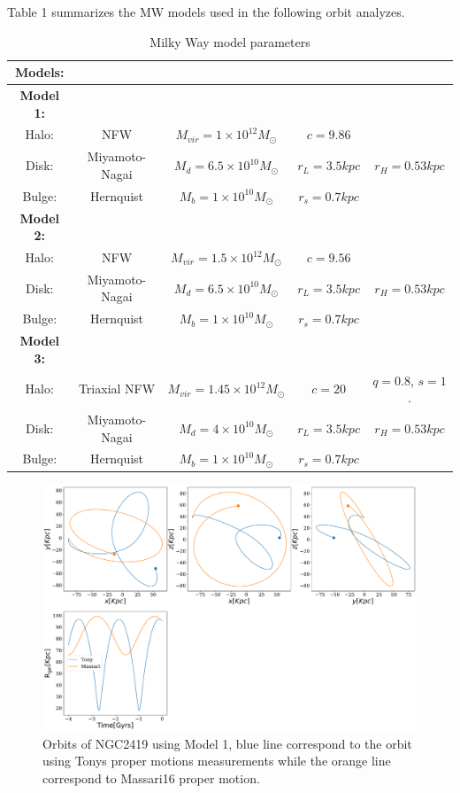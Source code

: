 \documentclass[14pt]{article}
\begin{document}
Table 1 summarizes the MW models used in the following orbit analyzes.

\begin{table}[H]
\centering
\begin{tabular}{c c c c c}
\hline
\hline
\textbf{Models:} & & & & \\
\hline
\textbf{Model 1:} & & & & \\
Halo: & NFW & $M_{vir} = 1\times 10^{12} M_{\odot}$ & $c=9.86$  \\
Disk: & Miyamoto-Nagai & $M_{d} = 6.5\times10^{10} M_{\odot}$ & $r_L = 3.5 kpc$ & $r_H = 0.53 kpc$ \\
Bulge: & Hernquist & $M_b = 1 \times 10^{10} M_{\odot}$ & $r_s=0.7 kpc$ & \\
\hline
\textbf{Model 2:} & & & & \\
Halo: & NFW & $M_{vir} = 1.5\times 10^{12} M_{\odot}$ & $c=9.56$  \\
Disk: & Miyamoto-Nagai & $M_{d} = 6.5\times10^{10} M_{\odot}$ & $r_L = 3.5 kpc$ & $r_H = 0.53 kpc$ \\
Bulge: & Hernquist & $M_b = 1 \times 10^{10} M_{\odot}$ & $r_s=0.7 kpc$ & \\
\hline
\textbf{Model 3:} & & & & \\
Halo: & Triaxial NFW & $M_{vir} = 1.45\times 10^{12} M_{\odot}$ &
$c=20$  & $q=0.8$, $s=1$. \\
Disk: & Miyamoto-Nagai & $M_{d} = 4\times10^{10} M_{\odot}$ & $r_L = 3.5 kpc$ & $r_H = 0.53 kpc$ \\
Bulge: & Hernquist & $M_b = 1 \times 10^{10} M_{\odot}$ & $r_s=0.7 kpc$ & \\
\hline
\hline
\end{tabular}
\caption{Milky Way model parameters}
\end{table}


\begin{figure}[H]
\centering
\includegraphics[scale=0.3]{../exploratory_code/NGC2419_sphMW.pdf}
\caption{Orbits of NGC2419 using Model 1, blue line correspond to
the orbit using Tonys proper motions measurements while the orange line correspond to
Massari16 proper motion.}
\end{figure}
\end{document}
